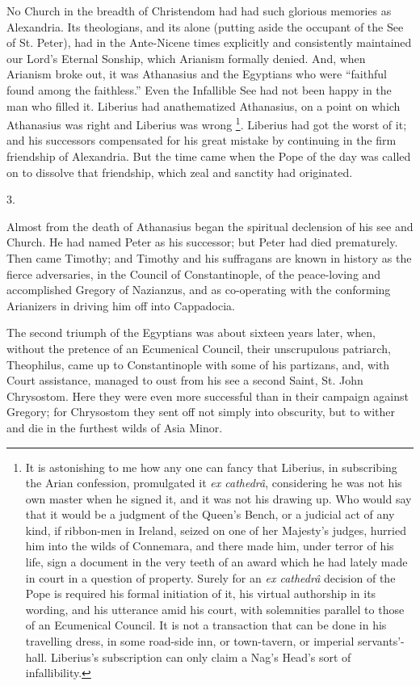 No Church in the breadth of Christendom had had such glorious
memories as Alexandria. Its theologians, and its alone (putting aside
the occupant of the See of St. Peter), had in the Ante-Nicene times
explicitly and consistently maintained our Lord's Eternal Sonship,
which Arianism formally denied. And, when Arianism broke out, it was
Athanasius and the Egyptians who were ``faithful found among the
faithless.'' Even the Infallible See had not been happy in the man
who filled it. Liberius had anathematized Athanasius, on a point on
which Athanasius was right and Liberius was wrong \footnote{It is astonishing to me how any one can fancy that Liberius, in
subscribing the Arian confession, promulgated it \emph{ex cathedrâ},
considering he was not his own master when he signed it, and it was
not his drawing up. Who would say that it would be a judgment of the
Queen's Bench, or a judicial act of any kind, if ribbon-men in
Ireland, seized on one of her Majesty's judges, hurried him into the
wilds of Connemara, and there made him, under terror of his life, sign
a document in the very teeth of an award which he had lately made in
court in a question of property. Surely for an \emph{ex cathedrâ}
decision of the Pope is required his formal initiation of it, his
virtual authorship in its wording, and his utterance amid his court,
with solemnities parallel to those of an Ecumenical Council. It is not
a transaction that can be done in his travelling dress, in some
road-side inn, or town-tavern, or imperial servants'-hall. Liberius's
subscription can only claim a Nag's Head's sort of infallibility.}. Liberius had got the worst of it; and his successors
compensated for his great mistake by continuing in the firm friendship
of Alexandria. But the time came when the Pope of the day was called
on to dissolve that friendship, which zeal and sanctity had
originated.

3.

Almost from the death of Athanasius began the spiritual
declension of his see and Church. He had named Peter as his successor;
but Peter had died prematurely. Then came Timothy; and Timothy and his
suffragans are known in history as the fierce adversaries, in the
Council of Constantinople, of the peace-loving and accomplished
Gregory of Nazianzus, and as co-operating with the conforming
Arianizers in driving him off into Cappadocia.

The second triumph of the Egyptians was about sixteen years later,
when, without the pretence of an Ecumenical Council, their
unscrupulous patriarch, Theophilus, came up to Constantinople with
some of his partizans, and, with Court assistance, managed to oust
from his see a second Saint, St. John Chrysostom. Here they were even
more successful than in their campaign against Gregory; for Chrysostom
they sent off not simply into obscurity, but to wither and die in the
furthest wilds of Asia Minor.

